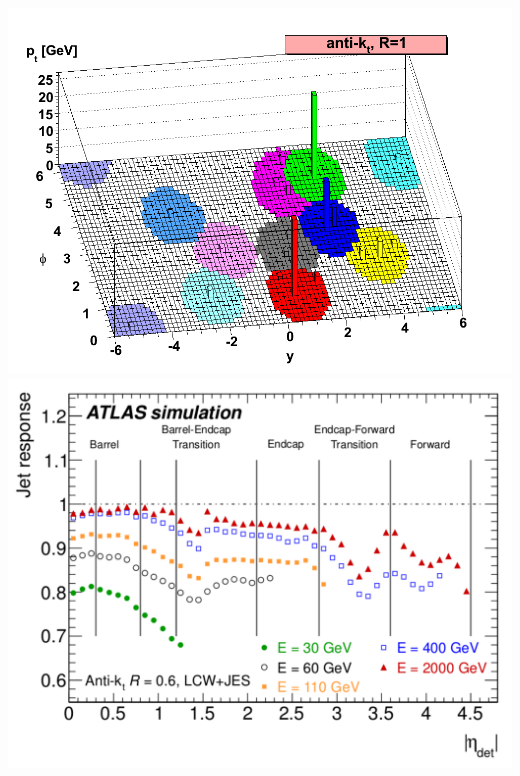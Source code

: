 \begin{frame}
\begin{minipage}{.5\textwidth}
\end{minipage}\begin{minipage}{.5\textwidth}\centering
\includegraphics[width=.78\textwidth]{pics/antikt}\\
\includegraphics[width=.9\textwidth]{pics/corr_jet_lcw}

\end{minipage}


\end{frame}




